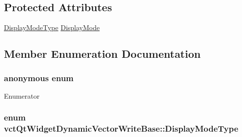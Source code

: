 \subsection*{Protected Attributes}
\begin{DoxyCompactItemize}
\item 
\hyperlink{classvct_qt_widget_dynamic_vector_write_base_aefbf6a51f1009f060305c2b5e106cf02}{Display\-Mode\-Type} \hyperlink{classvct_qt_widget_dynamic_vector_write_base_abd15e71cc767b0d6185d6d67b0fc5dca}{Display\-Mode}
\end{DoxyCompactItemize}


\subsection{Member Enumeration Documentation}
\hypertarget{classvct_qt_widget_dynamic_vector_write_base_a2bae677048cad1441ab937cb78737743}{\subsubsection[{anonymous enum}]{\setlength{\rightskip}{0pt plus 5cm}anonymous enum\hspace{0.3cm}{\ttfamily [protected]}}}\label{classvct_qt_widget_dynamic_vector_write_base_a2bae677048cad1441ab937cb78737743}
\begin{Desc}
\item[Enumerator]\par
\begin{description}
\item[{\em 
\hypertarget{classvct_qt_widget_dynamic_vector_write_base_a2bae677048cad1441ab937cb78737743ab508a86bc91e13c000f3634a96f7b44f}{S\-L\-I\-D\-E\-R\-\_\-\-R\-E\-S\-O\-L\-U\-T\-I\-O\-N}\label{classvct_qt_widget_dynamic_vector_write_base_a2bae677048cad1441ab937cb78737743ab508a86bc91e13c000f3634a96f7b44f}
}]\end{description}
\end{Desc}
\hypertarget{classvct_qt_widget_dynamic_vector_write_base_aefbf6a51f1009f060305c2b5e106cf02}{
\subsubsection[{Display\-Mode\-Type}]{\setlength{\rightskip}{0pt plus 5cm}enum {\bf vct\-Qt\-Widget\-Dynamic\-Vector\-Write\-Base\-::\-Display\-Mode\-Type}}}\label{classvct_qt_widget_dynamic_vector_write_base_aefbf6a51f1009f060305c2b5e106cf02}
